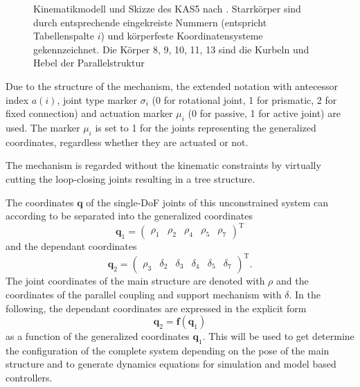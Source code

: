 \documentclass[letterpaper, 10 pt, conference]{ieeeconf}  %
\begin{document}
%
\begin{figure}[tb]
    \tiny
    \begin{minipage}[t]{7.5cm}
        \vspace{0.2cm} %
        
    \end{minipage}
    
    \caption{Kinematikmodell und Skizze des KAS5 nach \cite{KhalilKle1986}. Starrkörper sind durch entsprechende eingekreiste Nummern (entspricht Tabellenspalte \glqq{}$i$\grqq{}) und körperfeste Koordinatensysteme gekennzeichnet. Die Körper 8, 9, 10, 11, 13 sind die Kurbeln und Hebel der Parallelstruktur}
    \label{fig:KAS5_kinematik}
\end{figure}

Due to the structure of the mechanism, the extended notation with antecessor index $a(i)$, joint type marker $\sigma_i$ (0 for rotational joint, 1 for prismatic, 2 for fixed connection) and actuation marker $\mu_i$ (0 for passive, 1 for active joint) are used.
The marker $\mu_i$ is set to 1 for the joints representing the generalized coordinates, regardless whether they are actuated or not.

The mechanism is regarded without the kinematic constraints by virtually cutting the loop-closing joints resulting in a tree structure.

The coordinates $\bm{q}$ of the single-DoF joints of this unconstrained system can according to \cite{NakamuraGho1989} be separated into the generalized coordinates
%
\begin{equation}
\bm{q}_1=\begin{pmatrix}\rho_1 & \rho_2 & \rho_4 & \rho_5 &\rho_7 \end{pmatrix}^\mathrm{T}
\end{equation}
%
and the dependant coordinates
%
\begin{equation}
\bm{q}_2=\begin{pmatrix}\rho_3 & \delta_2 & \delta_3 & \delta_4 & \delta_5 & \delta_7 \end{pmatrix}^\mathrm{T}.
\end{equation}
%
The joint coordinates of the main structure are denoted with $\rho$ and the coordinates of the parallel coupling and support mechanism with $\delta$.
%
In the following, the dependant coordinates are expressed in the explicit form
%
\begin{equation}
\bm{q}_2=\bm{f}(\bm{q}_1)
\end{equation}
%
as a function of the generalized coordinates $\bm{q}_1$.
This will be used to get determine the configuration of the complete system depending on the pose of the main structure and to generate dynamics equations for simulation and model based controllers.
\end{document}

